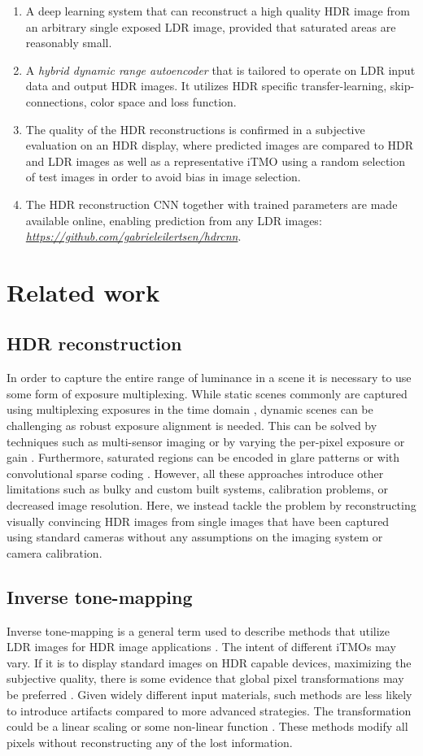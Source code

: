 \documentclass[acmtog]{acmart}
\newcommand\customsection[1]{\subsection{#1}}
\begin{document}
\begin{enumerate}
	\item A deep learning system that can reconstruct a high quality HDR image from an arbitrary single exposed LDR image, provided that saturated areas are reasonably small.
	\item A \textit{hybrid dynamic range autoencoder} that is tailored to operate on LDR input data and output HDR images. It utilizes HDR specific transfer-learning, skip-connections, color space and loss function.
	\item The quality of the HDR reconstructions is confirmed in a subjective evaluation on an HDR display, where predicted images are compared to HDR and LDR images as well as a representative iTMO using a random selection of test images in order to avoid bias in image selection.
	\item The HDR reconstruction CNN together with trained parameters are made available online, enabling prediction from any LDR images: {\it\url{https://github.com/gabrieleilertsen/hdrcnn}}.
\end{enumerate}
 

\section{Related work}

\customsection{HDR reconstruction}
In order to capture the entire range of luminance in a scene it is necessary to use some form of exposure multiplexing. While static scenes commonly are captured using multiplexing exposures in the time domain \cite{Mann1994,Debevec1997,Unger2007}, dynamic scenes can be challenging as robust exposure alignment is needed. This can be solved by techniques such as multi-sensor imaging \cite{Tocci2011,Kronander2014} or by varying the per-pixel exposure \cite{Nayar2000} or gain \cite{hajisharif2015adaptive}. Furthermore, saturated regions can be encoded in glare patterns \cite{Rouf2011} or with convolutional sparse coding \cite{Serrano2016}. However, all these approaches introduce other limitations such as bulky and custom built systems, calibration problems, or decreased image resolution. 
Here, we instead tackle the problem by reconstructing visually convincing HDR images from single images that have been captured using standard cameras without any assumptions on the imaging system or camera calibration.

\customsection{Inverse tone-mapping} 
Inverse tone-mapping is a general term used to describe methods that utilize LDR images for HDR image applications \cite{Banterle2006}. The intent of different iTMOs may vary. If it is to display standard images on HDR capable devices, maximizing the subjective quality, there is some evidence that global pixel transformations may be preferred \cite{Masia2009}.  Given widely different input materials, such methods are less likely to introduce artifacts compared to more advanced strategies. The transformation could be a linear scaling \cite{Akyuz2007} or some non-linear function \cite{Masia2009,Masia2017}. These methods modify all pixels without reconstructing any of the lost information.
\end{document}
